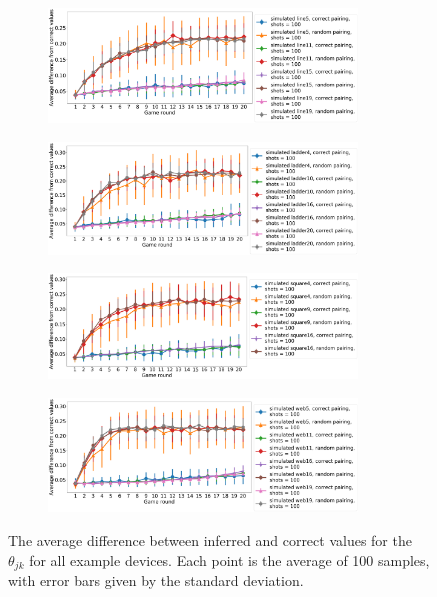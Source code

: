 \documentclass[aps,prl,twocolumn,showpacs,preprintnumbers]{revtex4-1}
\begin{document}
\begin{figure}
    \centering
    \begin{subfigure}[b]{\textwidth}
        \includegraphics[width=0.9\textwidth]{figures/line_diff.png}
    \end{subfigure}
    \begin{subfigure}[b]{\textwidth}
        \includegraphics[width=0.9\textwidth]{figures/ladder_diff.png}
    \end{subfigure}
    \begin{subfigure}[b]{\textwidth}
        \includegraphics[width=0.9\textwidth]{figures/square_diff.png}
    \end{subfigure}
    \begin{subfigure}[b]{\textwidth}
        \includegraphics[width=0.9\textwidth]{figures/web_diff.png}
    \end{subfigure}
    \caption{The average difference between inferred and correct values for the $\theta_{jk}$ for all example devices. Each point is the average of 100 samples, with error bars given by the standard deviation.}\label{fig:example_fuzz}
\end{figure}
\end{document}
